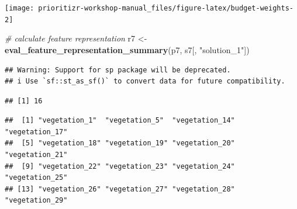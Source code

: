 \documentclass[12pt,]{book}
\newenvironment{Shaded}{\begin{snugshade}}{\end{snugshade}}
\newcommand{\CommentTok}[1]{\textcolor[rgb]{0.56,0.35,0.01}{\textit{#1}}}
\newcommand{\DataTypeTok}[1]{\textcolor[rgb]{0.13,0.29,0.53}{#1}}
\newcommand{\FloatTok}[1]{\textcolor[rgb]{0.00,0.00,0.81}{#1}}
\newcommand{\KeywordTok}[1]{\textcolor[rgb]{0.13,0.29,0.53}{\textbf{#1}}}
\newcommand{\NormalTok}[1]{#1}
\newcommand{\OperatorTok}[1]{\textcolor[rgb]{0.81,0.36,0.00}{\textbf{#1}}}
\newcommand{\OtherTok}[1]{\textcolor[rgb]{0.56,0.35,0.01}{#1}}
\newcommand{\StringTok}[1]{\textcolor[rgb]{0.31,0.60,0.02}{#1}}
\begin{document}
\begin{center}\texttt{[image: prioritizr-workshop-manual\_files/figure-latex/budget-weights-2]} \end{center}

\begin{Shaded}
\begin{Highlighting}[]
\CommentTok{# calculate feature representation}
\NormalTok{r7 <-}\StringTok{ }\KeywordTok{eval_feature_representation_summary}\NormalTok{(p7, s7[, }\StringTok{"solution_1"}\NormalTok{])}
\end{Highlighting}
\end{Shaded}

\begin{verbatim}
## Warning: Support for sp package will be deprecated.
## i Use `sf::st_as_sf()` to convert data for future compatibility.
\end{verbatim}

\begin{Shaded}
\end{Shaded}

\begin{verbatim}
## [1] 16
\end{verbatim}

\begin{Shaded}
\end{Shaded}

\begin{verbatim}
##  [1] "vegetation_1"  "vegetation_5"  "vegetation_14" "vegetation_17"
##  [5] "vegetation_18" "vegetation_19" "vegetation_20" "vegetation_21"
##  [9] "vegetation_22" "vegetation_23" "vegetation_24" "vegetation_25"
## [13] "vegetation_26" "vegetation_27" "vegetation_28" "vegetation_29"
\end{verbatim}
\end{document}
